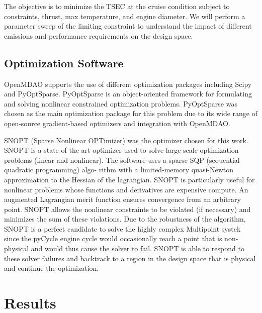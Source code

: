 \documentclass[conf]{new-aiaa}
\begin{document}
The objective is to minimize the TSEC at the cruise condition subject to constraints, thrust, max temperature, and engine diameter.
We will perform a parameter sweep of the limiting constraint to understand the impact of different emissions and performance requirements on the design space.

\subsection{Optimization Software}
OpenMDAO supports the use of different optimization packages including Scipy and PyOptSparse.
PyOptSparse is an object-oriented framework for formulating and solving nonlinear constrained optimization problems.
PyOptSparse was chosen as the main optimization package for this problem due to its wide range of open-source gradient-based optimizers and integration with OpenMDAO.

SNOPT (Sparse Nonlinear OPTimizer) was the optimizer chosen for this work.
SNOPT is a state-of-the-art optimizer used to solve large-scale optimization problems (linear and nonlinear).
The software uses a sparse SQP (sequential quadratic programming) algo- rithm with a limited-memory quasi-Newton approximation to the Hessian of the lagrangian.
SNOPT is particularly useful for nonlinear problems whose functions and derivatives are expensive compute.
An augmented Lagrangian merit function ensures convergence from an arbitrary point.
SNOPT allows the nonlinear constraints to be violated (if necessary) and minimizes the sum of these violations.
Due to the robustness of the algorithm, SNOPT is a perfect candidate to solve the highly complex Multipoint systek since the pyCycle engine cycle would occasionally reach a point that is non-physical and would thus cause the solver to fail.
SNOPT is able to respond to these solver failures and backtrack to a region in the design space that is physical and continue the optimization.


\section{Results}
\label{sec:results}
\end{document}
